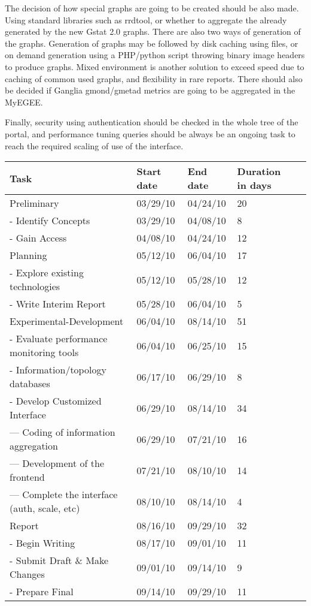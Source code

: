 The decision of how special graphs are going to be created should be also made. Using standard libraries such as rrdtool, or whether to aggregate the already generated by the new Gstat 2.0 graphs. There are also two ways of generation of the graphs. Generation of graphs may be followed by disk caching using files, or on demand generation using a PHP/python script throwing binary image headers to produce graphs. Mixed environment is another solution to exceed speed due to caching of common used graphs, and flexibility in rare reports. There should also be decided if Ganglia gmond/gmetad metrics are going to be aggregated in the MyEGEE. 

Finally, security using authentication should be checked in the whole tree of the portal, and performance tuning queries should be always be an ongoing task to reach the required scaling of use of the interface.

\begin{table}[ht]
\begin{tabular}{ | l | l | l | l | r |}
\hline
Task & Start date & End date & Duration in days \\ \hline
  Preliminary & 03/29/10 & 04/24/10 & 20 \\ \hline 
  -  Identify Concepts & 03/29/10 & 04/08/10 & 8 \\ \hline 
  -  Gain Access & 04/08/10 & 04/24/10 & 12 \\ \hline 
  Planning & 05/12/10 & 06/04/10 & 17 \\ \hline 
  -  Explore existing technologies & 05/12/10 & 05/28/10 & 12 \\ \hline 
  -  Write Interim Report & 05/28/10 & 06/04/10 & 5 \\ \hline 
  Experimental-Development & 06/04/10 & 08/14/10 & 51 \\ \hline 
  -  Evaluate performance monitoring tools & 06/04/10 & 06/25/10 & 15 \\ \hline 
  -  Information/topology databases & 06/17/10 & 06/29/10 & 8 \\ \hline 
  -  Develop Customized Interface & 06/29/10 & 08/14/10 & 34 \\ \hline 
  ---    Coding of information aggregation & 06/29/10 & 07/21/10 & 16 \\ \hline 
  ---    Development of the frontend & 07/21/10 & 08/10/10 & 14 \\ \hline 
  ---    Complete the interface (auth, scale, etc) & 08/10/10 & 08/14/10 & 4 \\
      \hline Report & 08/16/10 & 09/29/10 & 32 \\ \hline 
  -  Begin Writing & 08/17/10 & 09/01/10 & 11 \\ \hline 
  -  Submit Draft \& Make Changes & 09/01/10 & 09/14/10 & 9 \\ \hline 
  -  Prepare Final & 09/14/10 & 09/29/10 & 11 \\ \hline 
\end{tabular}
\label{tab:tasks}
\end{table}


